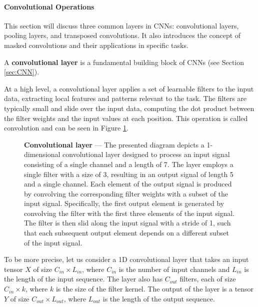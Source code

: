 \paragraph{Convolutional Operations} \label{sec:conv-layers}

This section will discuss three common layers in \acp{CNN}: convolutional layers, pooling layers, and transposed convolutions. It also introduces the concept of masked convolutions and their applications in specific tasks.

\label{sec:conv-layer}

A \textbf{convolutional layer} is a fundamental building block of \acp{CNN} (see Section \ref{sec:CNN}).

At a high level, a convolutional layer applies a set of learnable filters to the input data, extracting local features and patterns relevant to the task. The filters are typically small and slide over the input data, computing the dot product between the filter weights and the input values at each position. This operation is called convolution and can be seen in Figure \ref{fig:conv-layer}.

\begin{figure}[ht]
    \centering
    \caption[Convolutional layer]{\textbf{Convolutional layer} --- The presented diagram depicts a 1-dimensional convolutional layer designed to process an input signal consisting of a single channel and a length of 7. The layer employs a single filter with a size of 3, resulting in an output signal of length 5 and a single channel. Each element of the output signal is produced by convolving the corresponding filter weights with a subset of the input signal. Specifically, the first output element is generated by convolving the filter with the first three elements of the input signal. The filter is then slid along the input signal with a stride of 1, such that each subsequent output element depends on a different subset of the input signal.}
    \label{fig:conv-layer}
\end{figure}

To be more precise, let us consider a 1D convolutional layer that takes an input tensor $X$ of size $C_{in} \times L_{in}$, where $C_{in}$ is the number of input channels and $L_{in}$ is the length of the input sequence. The layer also has $C_{out}$ filters, each of size $C_{in} \times k$, where $k$ is the size of the filter kernel. The output of the layer is a tensor $Y$ of size $C_{out} \times L_{out}$, where $L_{out}$ is the length of the output sequence.

